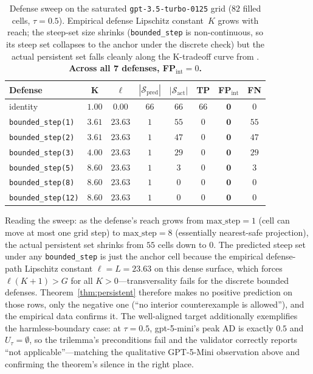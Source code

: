 \documentclass{article}
\begin{document}
\begin{table}[h]
\centering
\small
\caption{Defense sweep on the saturated
\texttt{gpt-3.5-turbo-0125} grid ($82$ filled cells, $\tau = 0.5$).
Empirical defense Lipschitz constant~$K$ grows with reach;
the steep-set size shrinks (\texttt{bounded\_step} is
non-continuous, so its steep set collapses to the anchor under
the discrete check) but the actual persistent set falls cleanly
along the K-tradeoff curve from .
\textbf{Across all 7 defenses, FP$_{\text{int}} = 0$.}}
\label{tab:live-sweep}
\begin{tabular}{lccccccc}
\toprule
\textbf{Defense} & $\boldsymbol{K}$ & $\boldsymbol{\ell}$ & $|\mathcal{S}_{\text{pred}}|$ & $|\mathcal{S}_{\text{act}}|$ & \textbf{TP} & \textbf{FP}$_{\text{int}}$ & \textbf{FN} \\
\midrule
identity                           & $1.00$ & $0.00$  & $66$ & $66$ & $66$ & $\mathbf{0}$ & $0$ \\
\texttt{bounded\_step(1)}          & $3.61$ & $23.63$ & $1$  & $55$ & $0$  & $\mathbf{0}$ & $55$ \\
\texttt{bounded\_step(2)}          & $3.61$ & $23.63$ & $1$  & $47$ & $0$  & $\mathbf{0}$ & $47$ \\
\texttt{bounded\_step(3)}          & $4.00$ & $23.63$ & $1$  & $29$ & $0$  & $\mathbf{0}$ & $29$ \\
\texttt{bounded\_step(5)}          & $8.60$ & $23.63$ & $1$  & $3$  & $0$  & $\mathbf{0}$ & $3$  \\
\texttt{bounded\_step(8)}          & $8.60$ & $23.63$ & $1$  & $0$  & $0$  & $\mathbf{0}$ & $0$  \\
\texttt{bounded\_step(12)}         & $8.60$ & $23.63$ & $1$  & $0$  & $0$  & $\mathbf{0}$ & $0$  \\
\bottomrule
\end{tabular}
\end{table}

Reading the sweep: as the defense's reach grows from
$\text{max\_step}=1$ (cell can move at most one grid step) to
$\text{max\_step}=8$ (essentially nearest-safe projection), the
actual persistent set shrinks from $55$ cells down to $0$. The
predicted steep set under any \texttt{bounded\_step} is just the
anchor cell because the empirical defense-path Lipschitz
constant $\ell = L = 23.63$ on this dense surface, which forces
$\ell(K{+}1) > G$ for all $K > 0$---transversality fails for the
discrete bounded defenses. Theorem~\ref{thm:persistent} therefore
makes no positive prediction on those rows, only the negative one
(``no interior counterexample is allowed''), and the empirical
data confirms it. The well-aligned target additionally exemplifies
the harmless-boundary case: at $\tau = 0.5$, gpt-5-mini's peak AD
is exactly $0.5$ and $U_\tau = \emptyset$, so the trilemma's
preconditions fail and the validator correctly reports
``not applicable''---matching the qualitative GPT-5-Mini
observation above and confirming the theorem's silence in the
right place.
\end{document}
